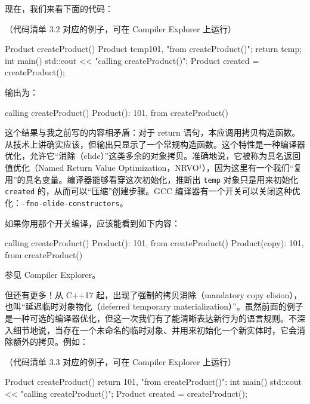 现在，我们来看下面的代码：

（代码清单 3.2 对应的例子，可在 Compiler Explorer 上运行）

\begin{codebox}[cpp]
Product createProduct() {
Product temp{101, "from createProduct()"};
return temp;
}
int main() {
std::cout << "calling createProduct()\n";
Product created = createProduct();
}
\end{codebox}

输出为：

\begin{codebox}[cpp]
calling createProduct()
Product(): 101, from createProduct()
\end{codebox}

这个结果与我之前写的内容相矛盾：对于 return 语句，本应调用拷贝构造函数。从技术上讲确实应该，但输出只显示了一个常规构造函数。这个特性是一种编译器优化，允许它“消除（elide）”这类多余的对象拷贝。准确地说，它被称为具名返回值优化（Named Return Value Optimization，NRVO¹），因为这里有一个我们“复用”的具名变量。编译器能够看穿这次初始化，推断出 \texttt{temp} 对象只是用来初始化 \texttt{created} 的，从而可以“压缩”创建步骤。GCC 编译器有一个开关可以关闭这种优化：\texttt{-fno-elide-constructors}。


如果你用那个开关编译，应该能看到如下内容：

\begin{codebox}[cpp]
calling createProduct()
Product(): 101, from createProduct()
Product(copy): 101, from createProduct()
\end{codebox}

参见 Compiler Explorer。

但还有更多！从 C++17 起，出现了强制的拷贝消除（mandatory copy elision），也叫“延迟临时对象物化（deferred temporary materialization）”。虽然前面的例子是一种可选的编译器优化，但这一次我们有了能清晰表达新行为的语言规则。不深入细节地说，当存在一个未命名的临时对象、并用来初始化一个新实体时，它会消除额外的拷贝。例如：

（代码清单 3.3 对应的例子，可在 Compiler Explorer 上运行）

\begin{codebox}[cpp]
Product createProduct() {
return {101, "from createProduct()"};
}
int main() {
std::cout << "calling createProduct()\n";
Product created = createProduct();
}
\end{codebox}

